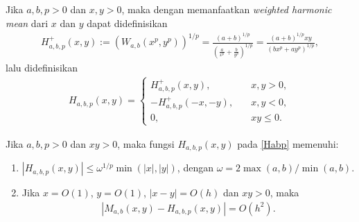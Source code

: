 Jika $a,b,p>0$ dan $x,y>0$, maka dengan memanfaatkan \textit{weighted harmonic mean} dari $x$ dan $y$ dapat didefinisikan
\begin{align*}
    H_{a,b,p}^+(x,y) := (W_{a,b}(x^p,y^p))^{1/p} = \frac{(a+b)^{1/p}}{(\frac{a}{x^p} + \frac{b}{y^p})^{1/p}} = \frac{(a+b)^{1/p}xy}{(bx^p + ay^p)^{1/p}},
\end{align*}
lalu didefinisikan
\begin{align}\label{Habp}
    H_{a,b,p}(x,y) = \begin{cases}
        H_{a,b,p}^+(x,y), \quad & x,y>0,\\
        -H_{a,b,p}^+(-x,-y), \quad & x,y<0,\\
        0, \quad & xy \leq 0.
    \end{cases}
\end{align}

\begin{lemma}\label{2prp}
    Jika $a,b,p > 0$ dan $xy > 0$, maka fungsi $H_{a,b,p}(x,y)$ pada \eqref{Habp} memenuhi:
    \begin{enumerate}
        \item $|H_{a,b,p}(x,y)| \leq \omega^{1/p}\min(|x|,|y|)$, dengan $\omega = 2 \max(a,b)/\min(a,b)$.
        \item Jika $x=O(1)$, $y=O(1)$, $|x-y|=O(h)$ dan $xy > 0$, maka
        \begin{align*}
            |M_{a,b}(x,y) - H_{a,b,p}(x,y)| = O(h^2).
        \end{align*}
    \end{enumerate}
\end{lemma}

